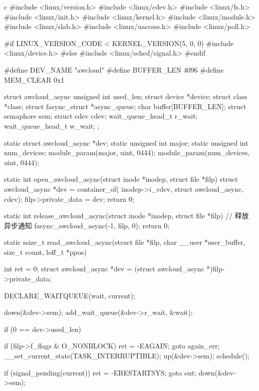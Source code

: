 \begin{code-block}{c}
#include <linux/version.h>
#include <linux/cdev.h>
#include <linux/fs.h>
#include <linux/init.h>
#include <linux/kernel.h>
#include <linux/module.h>
#include <linux/slab.h>
#include <linux/uaccess.h>
#include <linux/poll.h>

#if LINUX_VERSION_CODE < KERNEL_VERSION(5, 0, 0)
#include <linux/device.h>
#else
#include <linux/sched/signal.h>
#endif

#define DEV_NAME "awcloud"
#define BUFFER_LEN 4096
#define MEM_CLEAR 0x1

struct awcloud_async {
        unsigned int         used_len;
        struct device        *device;
        struct class         *class;
        struct fasync_struct *async_queue;
        char                 buffer[BUFFER_LEN];
        struct semaphore     sem;
        struct cdev          cdev;
        wait_queue_head_t    r_wait;
        wait_queue_head_t    w_wait;
};

static struct awcloud_async *dev;
static unsigned int major;
static unsigned int num_devices;
module_param(major, uint, 0444);
module_param(num_devices, uint, 0444);

static int open_awcloud_async(struct inode *inodep, struct file *filp)
{
        struct awcloud_async *dev = container_of(
                inodep->i_cdev, struct awcloud_async, cdev);
        filp->private_data = dev;
        return 0;
}

static int release_awcloud_async(struct inode *inodep, struct file *filp)
{
        // 释放异步通知
        fasync_awcloud_async(-1, filp, 0);
        return 0;
}

static ssize_t read_awcloud_async(struct file *filp,
        char __user *user_buffer, size_t count, loff_t *ppos)
{
        int ret = 0;
        struct awcloud_async *dev = (struct awcloud_async *)filp->private_data;

        DECLARE_WAITQUEUE(wait, current);

        down(&dev->sem);
        add_wait_queue(&dev->r_wait, &wait);

        if (0 == dev->used_len) {
                if (filp->f_flags & O_NONBLOCK) {
                        ret = -EAGAIN;
                        goto again_err;
                }
                __set_current_state(TASK_INTERRUPTIBLE);
                up(&dev->sem);
                schedule();

                if (signal_pending(current)) {
                        ret = -ERESTARTSYS;
                        goto out;
                }
                down(&dev->sem);
        }

}
\end{code-block}
